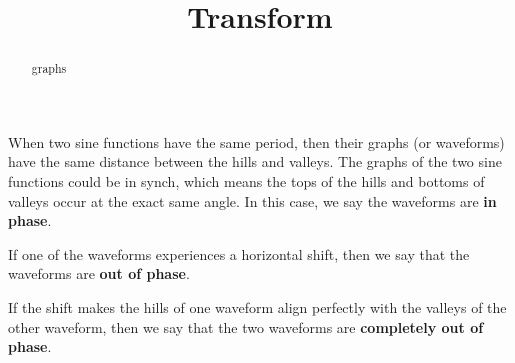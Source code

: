 \documentclass{ximera}
\title{Transform}
\begin{document}
\begin{abstract}
graphs
\end{abstract}
\maketitle



When two sine functions have the same period, then their graphs (or waveforms) have the same distance between the hills and valleys.   The graphs of the two sine functions could be in synch, which means the tops of the hills and bottoms of valleys occur at the exact same angle.  In this case, we say the waveforms are \textbf{in phase}.


If one of the waveforms experiences a horizontal shift, then we say that the waveforms are \textbf{out of phase}.

If the shift makes the hills of one waveform align perfectly with the valleys of the other waveform, then we say that the two waveforms are \textbf{completely out of phase}.
\end{document}
